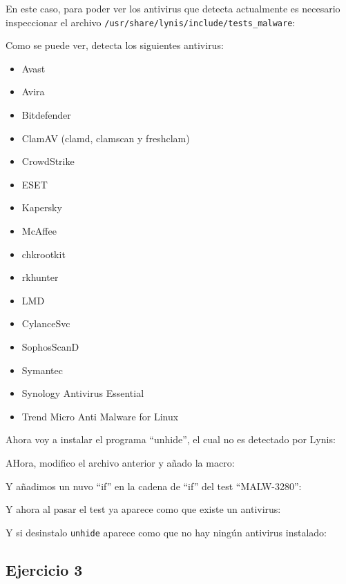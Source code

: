 \documentclass{article}
\begin{document}
En este caso, para poder ver los antivirus que detecta actualmente es necesario inspeccionar el archivo \verb|/usr/share/lynis/include/tests_malware|:


Como se puede ver, detecta los siguientes antivirus: 

\begin{itemize}
    \item Avast
    \item Avira
    \item Bitdefender
    \item ClamAV (clamd, clamscan y freshclam)
    \item CrowdStrike
    \item ESET
    \item Kapersky
    \item McAffee
    \item chkrootkit
    \item rkhunter
    \item LMD
    \item CylanceSvc
    \item SophosScanD
    \item Symantec
    \item Synology Antivirus Essential
    \item Trend Micro Anti Malware for Linux
\end{itemize}

Ahora voy a instalar el programa ``unhide'', el cual no es detectado por Lynis:


AHora, modifico el archivo anterior y añado la macro:


Y añadimos un nuvo ``if'' en la cadena de ``if'' del test ``MALW-3280'':


Y ahora al pasar el test ya aparece como que existe un antivirus:


Y si desinstalo \verb|unhide| aparece como que no hay ningún antivirus instalado:



\subsection*{Ejercicio 3}
\end{document}
